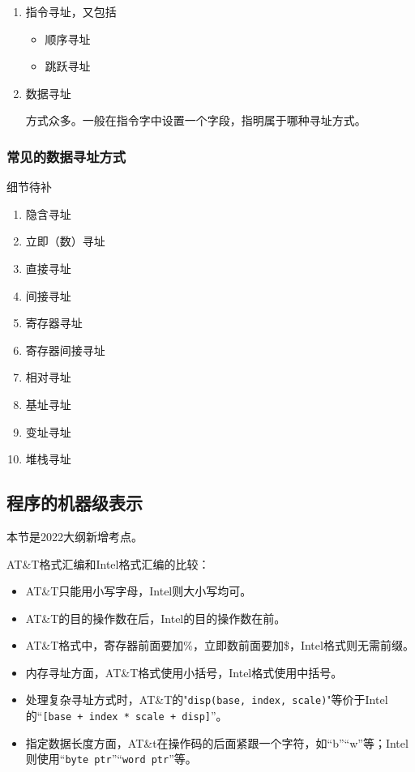 \documentclass[12pt, a4paper, oneside]{ctexart}
\begin{document}
\begin{enumerate}
  \item {\kaishu 指令寻址}，又包括
  \begin{itemize}
    \item 顺序寻址
    \item 跳跃寻址
  \end{itemize}
  \item {\kaishu 数据寻址}
  
  方式众多。一般在指令字中设置一个字段，指明属于哪种寻址方式。
\end{enumerate}

\subsubsection{常见的数据寻址方式}

细节待补

\begin{enumerate}
  \item {\kaishu 隐含寻址}
  \item {\kaishu 立即（数）寻址}
  \item {\kaishu 直接寻址}
  \item {\kaishu 间接寻址}
  \item {\kaishu 寄存器寻址}
  \item {\kaishu 寄存器间接寻址}
  \item {\kaishu 相对寻址}
  \item {\kaishu 基址寻址}
  \item {\kaishu 变址寻址}
  \item {\kaishu 堆栈寻址}
\end{enumerate}

\subsection{程序的机器级表示}

本节是2022大纲新增考点。

AT\&T格式汇编和Intel格式汇编的比较：
\begin{itemize}
  \item AT\&T只能用小写字母，Intel则大小写均可。
  \item AT\&T的目的操作数在后，Intel的目的操作数在前。
  \item AT\&T格式中，寄存器前面要加\%，立即数前面要加\$，Intel格式则无需前缀。
  \item 内存寻址方面，AT\&T格式使用小括号，Intel格式使用中括号。
  \item 处理复杂寻址方式时，AT\&T的"\verb|disp(base, index, scale)|"等价于Intel的“\verb|[base + index * scale + disp]|”。
  \item 指定数据长度方面，AT\&t在操作码的后面紧跟一个字符，如“b”“w”等；Intel则使用“\verb|byte ptr|”“\verb|word ptr|”等。
\end{itemize}
\end{document}
